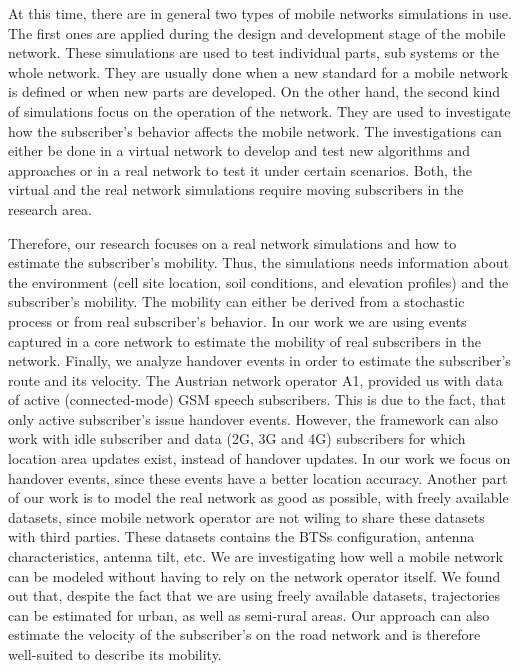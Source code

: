 \documentclass[twocolumn]{bmcart}%
\begin{document}
At this time, there are in general two types of mobile networks simulations in use. The first ones are applied during the design and development stage of the mobile network. These simulations are used to test individual parts, sub systems or the whole network. They are usually done when a new standard for a mobile network is defined or when new parts are developed. On the other hand, the second kind of simulations focus on the operation of the network. They are used to investigate how the subscriber's behavior affects the mobile network. The investigations can either be done in a virtual network to develop and test new algorithms and approaches or in a real network to test it under certain scenarios. Both, the virtual and the real network simulations require moving subscribers in the research area.

Therefore, our research focuses on a real network simulations and how to estimate the subscriber's mobility. Thus, the simulations needs information about the environment (cell site location, soil conditions, and elevation profiles) and the subscriber's mobility. The mobility can either be derived from a stochastic process or from real subscriber's behavior. In our work we are using events captured in a core network to estimate the mobility of real subscribers in the network. Finally, we analyze handover events in order to estimate the subscriber's route and its velocity.
The Austrian network operator A1, provided us with data of active (connected-mode) GSM speech subscribers. This is due to the fact, that only active subscriber's issue handover events. However, the framework can also work with idle subscriber and data (2G, 3G and 4G) subscribers for which location area updates exist, instead of handover updates. In our work we focus on handover events, since these events have a better location accuracy.
Another part of our work is to model the real network as good as possible, with freely available datasets, since mobile network operator are not wiling to share these datasets with third parties. These datasets contains the BTSs configuration, antenna characteristics, antenna tilt, etc. We are investigating how well a mobile network can be modeled without having to rely on the network operator itself.
We found out that, despite the fact that we are using freely available datasets, trajectories can be estimated for urban, as well as semi-rural areas. Our approach can also estimate the velocity of the subscriber's on the road network and is therefore well-suited to describe its mobility.
\end{document}
